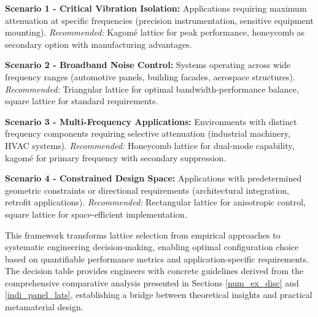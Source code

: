 \documentclass[review,numbers,sort&compress]{elsarticle}
\begin{document}
\textbf{Scenario 1 - Critical Vibration Isolation:} Applications requiring maximum attenuation at specific frequencies (precision instrumentation, sensitive equipment mounting). \textit{Recommended:} Kagomé lattice for peak performance, honeycomb as secondary option with manufacturing advantages.

\textbf{Scenario 2 - Broadband Noise Control:} Systems operating across wide frequency ranges (automotive panels, building facades, aerospace structures). \textit{Recommended:} Triangular lattice for optimal bandwidth-performance balance, square lattice for standard requirements.

\textbf{Scenario 3 - Multi-Frequency Applications:} Environments with distinct frequency components requiring selective attenuation (industrial machinery, HVAC systems). \textit{Recommended:} Honeycomb lattice for dual-mode capability, kagomé for primary frequency with secondary suppression.

\textbf{Scenario 4 - Constrained Design Space:} Applications with predetermined geometric constraints or directional requirements (architectural integration, retrofit applications). \textit{Recommended:} Rectangular lattice for anisotropic control, square lattice for space-efficient implementation.

This framework transforms lattice selection from empirical approaches to systematic engineering decision-making, enabling optimal configuration choice based on quantifiable performance metrics and application-specific requirements. The decision table provides engineers with concrete guidelines derived from the comprehensive comparative analysis presented in Sections \ref{num_ex_disc} and \ref{indi_panel_lats}, establishing a bridge between theoretical insights and practical metamaterial design.

\newpage

\end{document}
